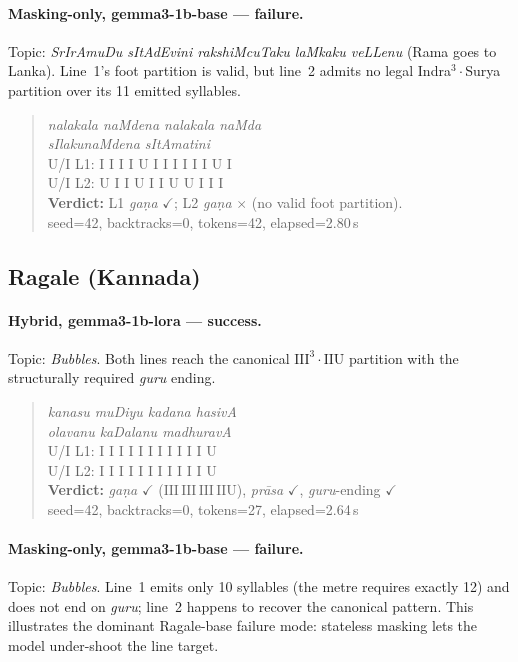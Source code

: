\documentclass[11pt]{article}
\begin{document}
\paragraph{Masking-only, gemma3-1b-base --- failure.}
Topic: \textit{SrIrAmuDu sItAdEvini rakshiMcuTaku laMkaku veLLenu}
(Rama goes to Lanka). Line~1's foot partition is valid, but line~2
admits no legal Indra$^3$\,$\cdot$\,Surya partition over its 11
emitted syllables.

\begin{quote}
\textit{nalakala naMdena nalakala naMda} \\
\textit{sIlakunaMdena sItAmatini} \\
\textsc{U/I L1:} I I I I U I I I I I I U I \\
\textsc{U/I L2:} U I I U I I U U I I I \\
\textbf{Verdict:} L1 \textit{ga\d{n}a} $\checkmark$;
L2 \textit{ga\d{n}a} $\times$
(no valid foot partition).
\\ {\footnotesize seed=42, backtracks=0, tokens=42, elapsed=2.80\,s}
\end{quote}

\subsection{Ragale (Kannada)}
\label{app:examples_ragale}

\paragraph{Hybrid, gemma3-1b-lora --- success.}
Topic: \textit{Bubbles}. Both lines reach the canonical
$\text{III}^3 \cdot \text{IIU}$ partition with the structurally
required \textit{guru} ending.

\begin{quote}
\textit{kanasu muDiyu kadana hasivA} \\
\textit{olavanu kaDalanu madhuravA} \\
\textsc{U/I L1:} I I I I I I I I I I I U \\
\textsc{U/I L2:} I I I I I I I I I I I U \\
\textbf{Verdict:} \textit{ga\d{n}a} $\checkmark$
($\text{III}\,\text{III}\,\text{III}\,\text{IIU}$),
\textit{pr\={a}sa} $\checkmark$, \textit{guru}-ending $\checkmark$
\\ {\footnotesize seed=42, backtracks=0, tokens=27, elapsed=2.64\,s}
\end{quote}

\paragraph{Masking-only, gemma3-1b-base --- failure.}
Topic: \textit{Bubbles}. Line~1 emits only 10 syllables (the metre
requires exactly 12) and does not end on \textit{guru}; line~2 happens
to recover the canonical pattern. This illustrates the dominant
Ragale-base failure mode: stateless masking lets the model
under-shoot the line target.
\end{document}
